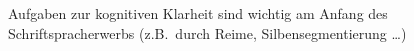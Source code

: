Aufgaben zur kognitiven Klarheit sind wichtig am Anfang des Schriftspracherwerbs (z.B.\ durch Reime, Silbensegmentierung \ldots)